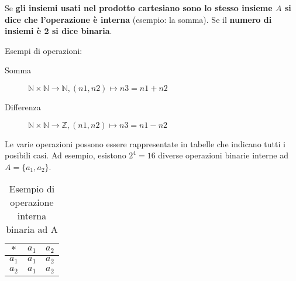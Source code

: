 \documentclass[a4paper,12pt,oneside]{article}
\begin{document}
Se \textbf{gli insiemi usati nel prodotto cartesiano sono lo stesso insieme \(A\)
si dice che l'operazione è interna} (esempio: la somma). Se il \textbf{numero di insiemi è 2 si dice binaria}.

Esempi di operazioni:
\begin{description}
    \item[Somma] \(\mathbb{N} \times \mathbb{N} \to \mathbb{N}, (n1, n2) \mapsto n3 = n1 + n2 \)
    \item[Differenza] \(\mathbb{N} \times \mathbb{N} \to \mathbb{Z}, (n1, n2) \mapsto n3 = n1 - n2 \)
\end{description}

Le varie operazioni possono essere rappresentate in tabelle che indicano tutti i
posibili casi. Ad esempio, esistono \(2^4 = 16\) diverse operazioni binarie 
interne ad \(A = \{a_1, a_2\}\).

\begin{table}[H]
    \centering
    \begin{tabular}{c|cc}
        \(\ast\) & \(a_1\) & \(a_2\) \\
        \midrule
        \(a_1\) & \(a_1\) & \(a_2\) \\
        \(a_2\) & \(a_1\) & \(a_2\) \\
    \end{tabular}
    \caption{Esempio di operazione interna binaria ad A}
\end{table}
\end{document}
